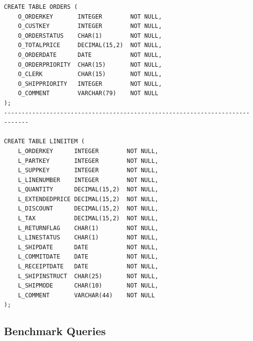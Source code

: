\documentclass[12pt]{article}
\begin{document}
\begin{verbatim}
CREATE TABLE ORDERS (
    O_ORDERKEY       INTEGER        NOT NULL,
    O_CUSTKEY        INTEGER        NOT NULL,
    O_ORDERSTATUS    CHAR(1)        NOT NULL,
    O_TOTALPRICE     DECIMAL(15,2)  NOT NULL,
    O_ORDERDATE      DATE           NOT NULL,
    O_ORDERPRIORITY  CHAR(15)       NOT NULL,
    O_CLERK          CHAR(15)       NOT NULL,
    O_SHIPPRIORITY   INTEGER        NOT NULL,
    O_COMMENT        VARCHAR(79)    NOT NULL
);
-----------------------------------------------------------------------------

CREATE TABLE LINEITEM (
    L_ORDERKEY      INTEGER        NOT NULL,
    L_PARTKEY       INTEGER        NOT NULL,
    L_SUPPKEY       INTEGER        NOT NULL,
    L_LINENUMBER    INTEGER        NOT NULL,
    L_QUANTITY      DECIMAL(15,2)  NOT NULL,
    L_EXTENDEDPRICE DECIMAL(15,2)  NOT NULL,
    L_DISCOUNT      DECIMAL(15,2)  NOT NULL,
    L_TAX           DECIMAL(15,2)  NOT NULL,
    L_RETURNFLAG    CHAR(1)        NOT NULL,
    L_LINESTATUS    CHAR(1)        NOT NULL,
    L_SHIPDATE      DATE           NOT NULL,
    L_COMMITDATE    DATE           NOT NULL,
    L_RECEIPTDATE   DATE           NOT NULL,
    L_SHIPINSTRUCT  CHAR(25)       NOT NULL,
    L_SHIPMODE      CHAR(10)       NOT NULL,
    L_COMMENT       VARCHAR(44)    NOT NULL
);

\end{verbatim}

\subsection*{Benchmark Queries}
\end{document}
